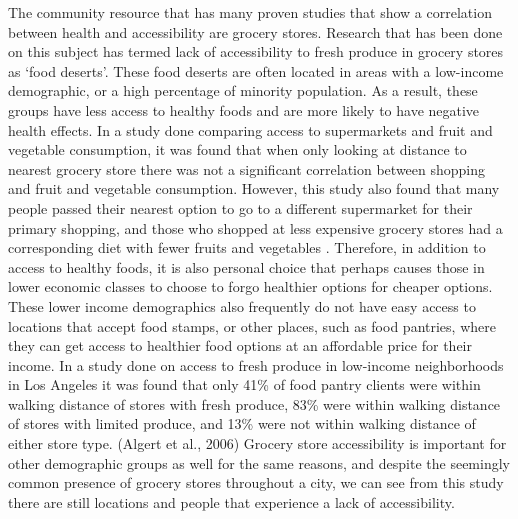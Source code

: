 \documentclass[3p, authoryear]{elsarticle} %
\begin{document}
The community resource that has many proven studies that show a correlation
between health and accessibility are grocery stores. Research that has been done
on this subject has termed lack of accessibility to fresh produce in grocery
stores as `food deserts'. These food deserts are often located in areas with a
low-income demographic, or a high percentage of minority population. As a
result, these groups have less access to healthy foods and are more likely to
have negative health effects. In a study done comparing access to supermarkets
and fruit and vegetable consumption, it was found that when only looking at
distance to nearest grocery store there was not a significant correlation
between shopping and fruit and vegetable consumption. However, this study also
found that many people passed their nearest option to go to a different
supermarket for their primary shopping, and those who shopped at less expensive
grocery stores had a corresponding diet with fewer fruits and vegetables \citep{aggarwal2014access}.
Therefore, in addition to access to healthy foods, it is
also personal choice that perhaps causes those in lower economic classes to
choose to forgo healthier options for cheaper options. These lower income
demographics also frequently do not have easy access to locations that accept
food stamps, or other places, such as food pantries, where they can get access
to healthier food options at an affordable price for their income. In a study
done on access to fresh produce in low-income neighborhoods in Los Angeles it
was found that only 41\% of food pantry clients were within walking distance of
stores with fresh produce, 83\% were within walking distance of stores with
limited produce, and 13\% were not within walking distance of either store type.
(Algert et al., 2006) Grocery store accessibility is important for other
demographic groups as well for the same reasons, and despite the seemingly
common presence of grocery stores throughout a city, we can see from this study
there are still locations and people that experience a lack of accessibility.
\end{document}
